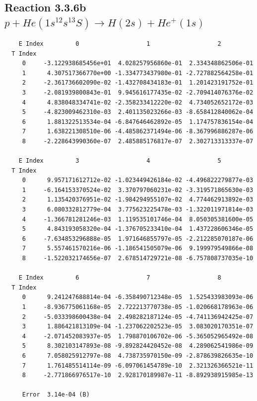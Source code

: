 \documentclass[12pt,dvipdfmx]{article}
\begin{document}
\newpage
\subsection{
Reaction 3.3.6b $  p + He(1s^12s^13S) \rightarrow H(2s) + He^+(1s)$}


\begin{small}\begin{verbatim}
    E Index         0                   1                   2
  T Index
     0     -3.122938685456e+01  4.028257956860e-01  2.334348862506e-01
     1      4.307517366770e+00 -1.334773437980e-01 -2.727882564258e-01
     2     -2.361736602090e-02 -1.432708434183e-01  1.201423191752e-01
     3     -2.081939800843e-01  9.945616177435e-02 -2.709414076376e-02
     4      4.838048334741e-02 -2.358233412220e-02  4.734052652172e-03
     5     -4.823009462310e-03  2.401135023266e-03 -8.658412840062e-04
     6      1.881322513534e-04 -6.847646462892e-05  1.174757836154e-04
     7      1.638221308510e-06 -4.485862371494e-06 -8.367996886287e-06
     8     -2.228643990360e-07  2.485885176817e-07  2.302713313337e-07

    E Index         3                   4                   5
  T Index
     0      9.957171612712e-02 -1.023449426184e-02 -4.496822279877e-03
     1     -6.164153370524e-02  3.370797060231e-02 -3.319571865630e-03
     2      1.135420376951e-02 -1.984294955107e-02  4.774462913892e-03
     3      6.080332812779e-04  3.775623225478e-03 -1.322011971814e-03
     4     -1.366781281246e-03  1.119535101746e-04  8.050305381600e-05
     5      4.843193058320e-04 -1.376705233410e-04  1.437228606346e-05
     6     -7.634853296888e-05  1.971646855797e-05 -2.212285070187e-06
     7      5.557461570216e-06 -1.186541505079e-06  9.199979549866e-08
     8     -1.522032174656e-07  2.678514729721e-08 -6.757808737035e-10

    E Index         6                   7                   8
  T Index
     0      9.241247688814e-04 -6.358490712348e-05  1.525433983093e-06
     1     -8.936775061168e-05  2.722213770738e-05 -1.020668178963e-06
     2     -5.033398600438e-04  2.498282187124e-05 -4.741136942425e-07
     3      1.886421813109e-04 -1.237062202523e-05  3.083020170351e-07
     4     -2.071452083937e-05  1.798870106702e-06 -5.365052965492e-08
     5      8.302103147893e-08 -9.892824420452e-08  4.289062541986e-09
     6      7.058025912797e-08  4.738735970150e-09 -2.878639826635e-10
     7      1.761485514114e-09 -6.097061454789e-10  2.321326366521e-11
     8     -2.771866976517e-10  2.928170189987e-11 -8.892938915985e-13

     Error  3.14e-04 (B)
\end{verbatim}\end{small}
\end{document}
